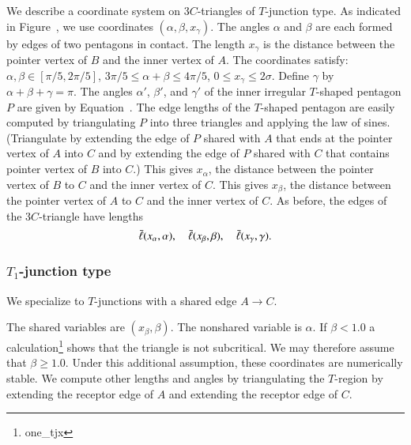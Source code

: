We describe a coordinate system on $3C$-triangles of $T$-junction
type.  As indicated in Figure~, we use coordinates
$(\alpha,\beta,x_\gamma)$.  The angles $\alpha$ and $\beta$ are each
formed by edges of two pentagons in contact.  The length $x_\gamma$ is
the distance between the pointer vertex of $B$ and the inner vertex of
$A$.  The coordinates satisfy: $\alpha,\beta\in[\pi/5,2\pi/5]$,
$3\pi/5\le \alpha+\beta\le 4\pi/5$, $0\le x_\gamma\le 2\sigma$.
Define $\gamma$ by $\alpha+\beta+\gamma=\pi$.  The angles $\alpha'$,
$\beta'$, and $\gamma'$ of the inner irregular $T$-shaped pentagon $P$
are given by Equation~.  The edge lengths of the
$T$-shaped pentagon are easily computed by triangulating $P$ into
three triangles and applying the law of sines.  (Triangulate by
extending the edge of $P$ shared with $A$ that ends at the pointer
vertex of $A$ into $C$ and by extending the edge of $P$ shared with
$C$ that contains pointer vertex of $B$ into $C$.)  This gives
$x_\alpha$, the distance between the pointer vertex of $B$ to $C$ and
the inner vertex of $C$.  This gives $x_\beta$, the distance between
the pointer vertex of $A$ to $C$ and the inner vertex of $C$.  As
before, the edges of the $3C$-triangle have lengths
\[
\bar\ell(x_\alpha,\alpha),\quad \bar\ell(x_\beta,\beta),\quad \bar\ell(x_\gamma,\gamma).
\]




\subsubsection{$T_1$-junction type}

We specialize to $T$-junctions with a shared edge $A\to C$.  

The shared variables are $(x_\beta,\beta)$.  The nonshared variable is $\alpha$.
If $\beta < 1.0$ a calculation\footnote{one\_tjx} shows that the triangle is not subcritical.  We may therefore assume
that $\beta \ge 1.0$.  Under this additional assumption,
these coordinates are numerically stable.    We compute other lengths and angles by triangulating the $T$-region by
extending the receptor edge of $A$ and extending the receptor edge of $C$.

